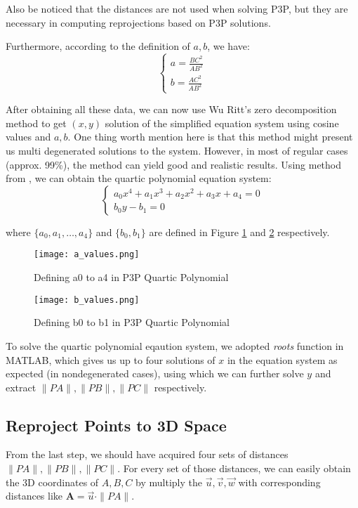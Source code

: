 \documentclass[conference]{IEEEtran}
\let\oldvec\vec
\renewcommand{\vec}[1]{\oldvec{\mathit{#1}}}
\newcommand{\mat}[1]{\mathbf{#1}} %
\begin{document}
Also be noticed that the distances are not used when solving P3P, but they are necessary in computing reprojections based on P3P solutions.

Furthermore, according to the definition of $a, b$, we have:
\begin{equation}
	\begin{cases}
		a = \frac{BC^2}{AB^2}\\
		b = \frac{AC^2}{AB^2}
	\end{cases}
\end{equation}

After obtaining all these data, we can now use Wu Ritt's zero decomposition method to get $(x, y)$ solution of the simplified equation system using cosine values and $a, b$. One thing worth mention here is that this method might present us multi degenerated solutions to the system. However, in most of regular cases (approx. 99\%), the method can yield good and realistic 
results. Using method from \cite{gao2003complete}, we can obtain the quartic polynomial equation system:
\begin{equation}
	\begin{cases}
		a_0x^4 + a_1x^3 + a_2x^2 + a_3x + a_4 = 0\\
		b_0y - b_1 = 0
	\end{cases}
\end{equation}

where $\{a_0, a_1, \dots , a_4\}$ and $\{b_0, b_1\}$ are defined in Figure \ref{a_values} and \ref{b_values} respectively.

\begin{figure}
  \centering \texttt{[image: a\_values.png]}
  \caption{Defining a0 to a4 in P3P Quartic Polynomial}
  \label{a_values}
\end{figure}
\begin{figure}
  \centering \texttt{[image: b\_values.png]}
  \caption{Defining b0 to b1 in P3P Quartic Polynomial}
  \label{b_values}
\end{figure}

To solve the quartic polynomial eqaution system, we adopted \emph{roots} function in MATLAB, which gives us up to four solutions of $x$ in the equation system as expected (in nondegenerated cases), using which we can further solve $y$ and extract $\|PA\|, \|PB\|, \|PC\|$ respectively.

\subsection{Reproject Points to 3D Space}
From the last step, we should have acquired four sets of distances $\|PA\|, \|PB\|, \|PC\|$. For every set of those distances, we can easily obtain the 3D coordinates of $A, B, C$ by multiply the $\vec{u}, \vec{v}, \vec{w}$ with corresponding distances like $\mat{A} = \vec{u}\cdot \|PA\|$.
\end{document}
